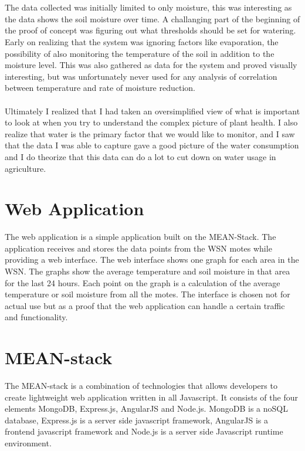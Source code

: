 \documentclass[]{uiophd}
\begin{document}
\\\\
The data collected was initially limited to only moisture, this was interesting as the data shows the soil moisture over time. A challanging part of the beginning of the proof of concept was figuring out what thresholds should be set for watering. Early on realizing that the system was ignoring factors like evaporation, the possibility of also monitoring the temperature of the soil in addition to the moisture level. This was also gathered as data for the system and proved visually interesting, but was unfortunately never used for any analysis of correlation between temperature and rate of moisture reduction.
\\\\
Ultimately I realized that I had taken an oversimplified view of what is important to look at when you try to understand the complex picture of plant health. I also realize that water is the primary factor that we would like to monitor, and I saw that the data I was able to capture gave a good picture of the water consumption and I do theorize that this data can do a lot to cut down on water usage in agriculture.

\section{Web Application}
The web application is a simple application built on the MEAN-Stack. The application receives and stores the data points from the WSN motes while providing a web interface. The web interface shows one graph for each area in the WSN. The graphs show the average temperature and soil moisture in that area for the last 24 hours. Each point on the graph is a calculation of the average temperature or soil moisture from all the motes. The interface is chosen not for actual use but as a proof that the web application can handle a certain traffic and functionality. 

\section{MEAN-stack}
The MEAN-stack is a combination of technologies that allows developers to create lightweight web application written in all Javascript. It consists of the four elements MongoDB, Express.js, AngularJS and Node.js. MongoDB is a noSQL database, Express.js is a server side javascript framework, AngularJS is a frontend javascript framework and Node.js is a server side Javascript runtime environment. 
\end{document}
